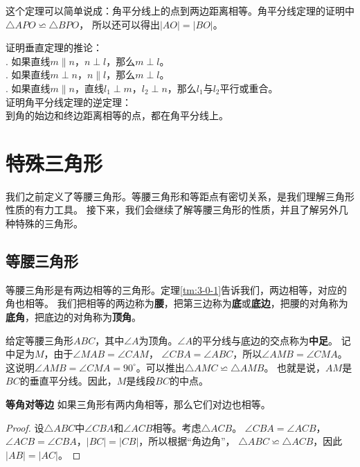 \documentclass[12pt,UTF8,fontset=none]{ctexbook}
\begin{document}
这个定理可以简单说成：角平分线上的点到两边距离相等。角平分线定理的证明中$\triangle APO \backsimeq \triangle BPO$，
所以还可以得出$|AO| = |BO|$。

\begin{xt}
    证明垂直定理的推论：\\
    . 如果直线$m \parallel n$，$n \perp l$，那么$m \perp l$。\\
    . 如果直线$m \perp n$，$n \parallel l$，那么$m \perp l$。\\
    . 如果直线$m \parallel n$，直线$l_1 \perp m$，$l_2 \perp n$，那么$l_1$与$l_2$平行或重合。\\
    证明角平分线定理的逆定理：\\
    \indent 到角的始边和终边距离相等的点，都在角平分线上。
\end{xt}

\chapter{特殊三角形}
我们之前定义了等腰三角形。等腰三角形和等距点有密切关系，是我们理解三角形性质的有力工具。
接下来，我们会继续了解等腰三角形的性质，并且了解另外几种特殊的三角形。

\section{等腰三角形}
等腰三角形是有两边相等的三角形。定理\ref{tm:3-0-1}告诉我们，两边相等，对应的角也相等。
我们把相等的两边称为\textbf{腰}，把第三边称为\textbf{底}或\textbf{底边}，把腰的对角称为\textbf{底角}，把底边的对角称为\textbf{顶角}。

给定等腰三角形$ABC$，其中$\angle A$为顶角。$\angle A$的平分线与底边的交点称为\textbf{中足}。
记中足为$M$，由于$\angle MAB = \angle CAM$，
$\angle CBA = \angle ABC$，所以$\angle AMB = \angle CMA$。
这说明$\angle AMB = \angle CMA = 90^\circ$。可以推出$\triangle AMC \backsimeq \triangle AMB$。
也就是说，$AM$是$BC$的垂直平分线。因此，$M$是线段$BC$的中点。

\begin{tm}{\textbf{等角对等边}}\label{tm:4-0-0}
    如果三角形有两内角相等，那么它们对边也相等。
\end{tm}
\begin{proof}
    设$\triangle ABC$中$\angle CBA$和$\angle ACB$相等。考虑$\triangle ACB$。
    $\angle CBA = \angle ACB$，$\angle ACB = \angle CBA$，$|BC| = |CB|$，所以根据“角边角”，
    $\triangle ABC \backsimeq \triangle ACB$，因此$|AB| = |AC|$。
\end{proof}
\end{document}
